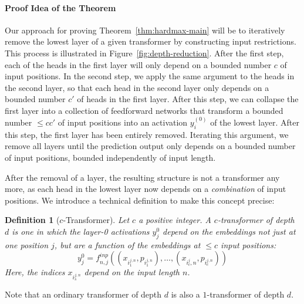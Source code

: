 \documentclass[11pt,a4paper]{article}
\newcounter{theorem}
\newtheorem{defin}[theorem]{Definition}
\begin{document}

\paragraph{Proof Idea of the Theorem}
Our approach for proving Theorem~\ref{thm:hardmax-main} will be to iteratively remove the lowest layer of a given transformer by constructing input restrictions.
This process is illustrated in Figure~\ref{fig:depth-reduction}.
After the first step, each of the heads in the first layer will only depend on a bounded number $c$ of input positions.
In the second step, we apply the same argument to the heads in the second layer, so that each head in the second layer only depends on a bounded number $c'$ of heads in the first layer.
After this step, we can collapse the first layer into a collection of feedforward networks that transform a bounded number $\leq cc'$ of input positions into an activation $y_i^{(0)}$ of the lowest layer.
After this step, the first layer has been entirely removed.
Iterating this argument, we remove all layers until the prediction output only depends on a bounded number of input positions, bounded independently of input length.

After the removal of a layer, the resulting structure is not a transformer any more, as each head in the lowest layer now depends on a \emph{combination} of input positions.
We introduce a technical definition to make this concept precise:

\begin{defin}[$c$-Transformer]
Let $c$ a positive integer. A $c$-transformer of depth $d$ is one in which the layer-0 activations $y_j^0$ depend on the embeddings not just at one position $j$, but are a function of the embeddings at $\leq c$ input positions:
\begin{equation}
    y_j^0 = f^{inp}_{n,j}((x_{i_1^{j,n}}, p_{i_1^{j,n}}), \dots, (x_{i_c^{j},n}, p_{i_c^{j,n}} ))
\end{equation}
Here, the indices $x_{i_s^{j,n}}$ depend on the input length $n$.
\end{defin}

Note that an ordinary transformer  of depth $d$ is also a $1$-transformer of depth $d$.
\end{document}
